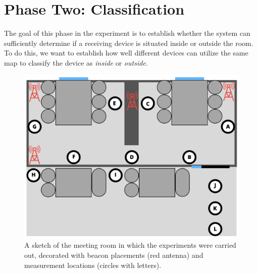 \section{Phase Two: Classification}\label{sec:eval_phase2} %
The goal of this phase in the experiment is to establish whether the system can sufficiently determine if a receiving device is situated inside or outside the room.
To do this, we want to establish how well different devices can utilize the same map to classify the device as \textit{inside} or \textit{outside}. 
\begin{figure}[h]
    \centering
    \includegraphics[scale=0.5]{images/experiment_setup.png}
    \caption{A sketch of the meeting room in which the experiments were carried out, decorated with beacon placements (red antenna) and measurement locations (circles with letters).}
    \label{fig:experiment_setup}
\end{figure}

